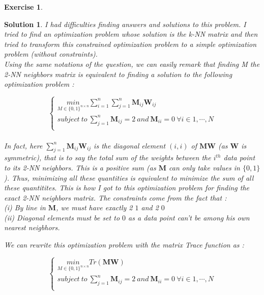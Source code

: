 \documentclass[12pt,a4paper]{article}
\newtheorem{exercise}{Exercise}
\newtheorem{solution}{Solution}
\begin{document}
\begin{exercise}

\end{exercise}
\begin{solution}
I had difficulties finding answers and solutions to this problem. I tried to find an optimization problem whose solution is the k-NN matrix and then tried to transform this constrained optimization problem to a simple optimization problem (without constraints).\\

Using the same notations of the question, we can easily remark that finding M the 2-NN neighbors matrix is equivalent to finding a solution to the following optimization problem :

\[\begin{cases}
    \underset{M \in \{0,1\}^{n \times n}}{min} \sum_{i=1}^n \sum_{j=1}^n \boldsymbol M_{ij} \boldsymbol W_{ij}\\
     subject\ to\ \sum_{j=1}^n \boldsymbol M_{ij} = 2 \ and\ \boldsymbol M_{ii} = 0 \ \forall i \in 1,\cdots,N\\
            \end{cases}\]\\
            
In fact, here $\sum_{j=1}^n \boldsymbol M_{ij} \boldsymbol W_{ij}$ is the diagonal element $(i,i)$ of $\boldsymbol M \boldsymbol W$ (as $\boldsymbol W$ is symmetric), that is to say the total sum of the weights between the $i^{th}$ data point to its 2-NN neighbors. This is a positive sum (as $\boldsymbol M$ can only take values in $\{0,1\}$). Thus, minimizing all these quantities is equivalent to minimize the sum of all these quantitites. This is how I got to this optimization problem for finding the exact 2-NN neighbors matrix. The constraints come from the fact that :\\
(i) By line in $\boldsymbol M$, we must have exactly 2 $1$ and 2 $0$\\
(ii) Diagonal elements must be set to $0$ as a data point can't be among his own nearest neigbhors.

We can rewrite this optimization problem with the matrix Trace function as : 

\[\begin{cases}
    \underset{M \in \{0,1\}^{n \times n}}{min} Tr(\boldsymbol M \boldsymbol W)\\
     subject\ to\ \sum_{j=1}^n \boldsymbol M_{ij} = 2 \ and\ \boldsymbol M_{ii} = 0 \ \forall i \in 1,\cdots,N\\
            \end{cases}\]\\
            

\end{solution}
\end{document}
